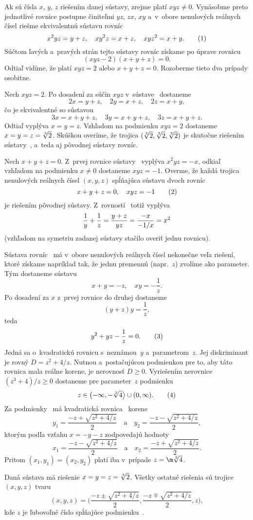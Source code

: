 {%
Ak sú čísla $x$, $y$, $z$ riešením danej sústavy, zrejme platí
$xyz\ne0$. Vynásobme preto jednotlivé rovnice postupne činiteľmi $yz$, $zx$,
$xy$ a~v~obore nenulových reálnych čísel riešme
ekvivalentnú sústavu rovníc
$$
x^2yz=y+z,\quad xy^2z=x+z,\quad xyz^2=x+y. \tag1
$$
Súčtom ľavých a~pravých strán tejto sústavy rovníc získame po
úprave rovnicu
$$
(xyz-2)(x+y+z)=0.
$$
Odtiaľ vidíme, že platí $xyz=2$ alebo $x+y+z=0$. Rozoberme tieto dva prípady osobitne.

\smallskip
Nech $xyz=2$. Po dosadení za súčin $xyz$ v~sústave~
dostaneme
$$
2x=y+z,\quad 2y=x+z,\quad 2z=x+y,
$$
čo je ekvivalentné so sústavou
$$
3x=x+y+z,\quad 3y=x+y+z,\quad 3z=x+y+z.
$$
Odtiaľ vyplýva $x=y=z$. Vzhľadom na podmienku $xyz=2$ dostaneme
$x=y=z=\root3\of{2}$. Skúškou overíme, že trojica
$(\root3\of{2},\root3\of{2}, \root3\of{2})$ je skutočne
riešením sústavy~, a~teda aj pôvodnej sústavy rovníc.

\smallskip
Nech $x+y+z=0$. Z~prvej rovnice sústavy~ vyplýva $x^2yz=-x$,
odkiaľ vzhľadom na podmienku $x\ne0$ dostaneme $xyz=-1$. Overme,
že každá trojica nenulových reálnych čísel $(x,y,z)$ spĺňajúca
sústavu dvoch rovníc
$$
x+y+z=0,\quad xyz=-1   \tag2
$$
je riešením pôvodnej sústavy. Z~rovností~ totiž vyplýva
$$
\postdisplaypenalty 10000
\frac{1}{y}+\frac{1}{z}=\frac{y+z}{yz}=\frac{-x}{-1/x}=x^2
$$
(vzhľadom na symetriu zadanej sústavy stačilo overiť jednu rovnicu).

Sústava rovníc~ má v~obore nenulových reálnych čísel
nekonečne veľa riešení, ktoré získame napríklad tak, že
jednu premennú (napr.~$z$) zvolíme ako parameter. Tým dostaneme
sústavu
$$
x+y=-z,\quad xy=-\frac{1}{z}.
$$
Po dosadení za $x$ z~prvej rovnice do druhej dostaneme
$$
(y+z)y=\frac{1}{z},
$$
teda
$$
y^2+yz-\frac{1}{z}=0.  \tag3
$$
Jedná sa o~kvadratickú rovnicu s~neznámou~$y$ a~parametrom~$z$.
Jej diskriminant je rovný $D=z^2+4/z$. Nutnou a~postačujúcou
podmienkou pre to, aby táto rovnica mala reálne korene,
je nerovnosť $D\geq0$. Vyriešením nerovnice $(z^3+4)/z\ge0$
dostaneme pre parameter~$z$ podmienku
$$
z\in\bigl(-\infty,-\root3\of{4}\bigr\rangle\cup(0,\infty).\tag4
$$
Za podmienky~ má kvadratická rovnica~ korene
$$
y_1=\frac{-z+\sqrt{z^2+4/z}}{2}
\quad\text{a}\quad
y_2=\frac{-z-\sqrt{z^2+4/z}}{2},
$$
ktorým podľa vzťahu $x=-y-z$ zodpovedajú hodnoty
$$
x_1=\frac{-z-\sqrt{z^2+4/z}}{2}
\quad\text{a}\quad
x_2=\frac{-z+\sqrt{z^2+4/z}}{2}.
$$
Pritom $(x_1,y_1)=(x_2,y_2)$ platí iba v~prípade $z=\m\root3\of4$.

\zaver
Daná sústava má riešenie $x=y=z=\root3\of2$.
Všetky ostatné riešenia sú trojice $(x,y,z)$ tvaru
$$
(x,y,z)=\biggl(\frac{-z\pm\sqrt{z^2+4/z}}{2},
              \frac{-z\mp\sqrt{z^2+4/z}}{2},z\biggr),
$$
kde $z$ je ľubovoľné číslo spĺňajúce podmienku~.}

